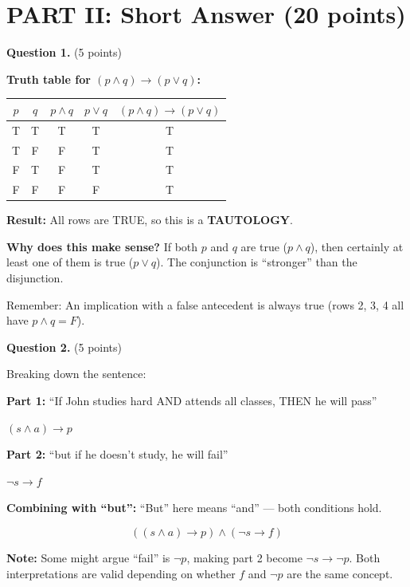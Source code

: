 \documentclass[11pt,a4paper]{article}
\begin{document}
\newpage

\section*{PART II: Short Answer (20 points)}

\textbf{Question 1.} (5 points)

\begin{solnbox}
\textbf{Truth table for $(p \land q) \to (p \lor q)$:}

\begin{center}
\begin{tabular}{cc|c|c|c}
\toprule
$p$ & $q$ & $p \land q$ & $p \lor q$ & $(p \land q) \to (p \lor q)$ \\
\midrule
T & T & T & T & T \\
T & F & F & T & T \\
F & T & F & T & T \\
F & F & F & F & T \\
\bottomrule
\end{tabular}
\end{center}

\textbf{Result:} All rows are TRUE, so this is a \textbf{TAUTOLOGY}.

\textbf{Why does this make sense?} If both $p$ and $q$ are true ($p \land q$), then certainly at least one of them is true ($p \lor q$). The conjunction is ``stronger'' than the disjunction.

Remember: An implication with a false antecedent is always true (rows 2, 3, 4 all have $p \land q = F$).
\end{solnbox}

\vspace{15pt}

\textbf{Question 2.} (5 points)

\begin{solnbox}
Breaking down the sentence:

\textbf{Part 1:} ``If John studies hard AND attends all classes, THEN he will pass''

$(s \land a) \to p$

\textbf{Part 2:} ``but if he doesn't study, he will fail''

$\neg s \to f$

\textbf{Combining with ``but'':} ``But'' here means ``and'' --- both conditions hold.

$$\boxed{((s \land a) \to p) \land (\neg s \to f)}$$

\textbf{Note:} Some might argue ``fail'' is $\neg p$, making part 2 become $\neg s \to \neg p$. Both interpretations are valid depending on whether $f$ and $\neg p$ are the same concept.
\end{solnbox}
\end{document}
